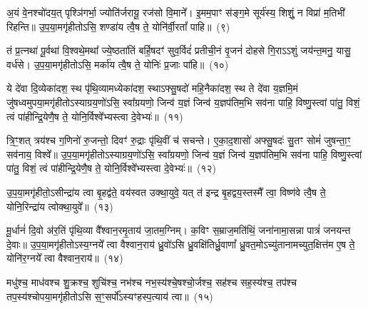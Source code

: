 {\anuvakamend[{प्रा॒त॒र्युजा॒वेका॒न्नविꣳ॑शतिः}]}%

अ॒यं वे॒नश्चो॑दय॒त् पृश्ञि॑गर्भा॒ ज्योति॑र्जरायू॒ रज॑सो वि॒माने᳚। इ॒मम॒पाꣳ स॑ङ्ग॒मे सूर्य॑स्य॒ शिशुं॒ न विप्रा॑ म॒तिभी॑ रिहन्ति॥ उ॒प॒या॒मगृ॑हीतो\-ऽसि॒ शण्डा॑य त्वै॒ष ते॒ योनि॑र्वी॒रतां᳚ पाहि॥~(९)

{\anuvakamend[{अ॒यं वे॒नः पञ्च॑विꣳशतिः}]}%

तं प्र॒त्नथा॑ पू॒र्वथा॑ वि॒श्वथे॒मथा᳚ ज्ये॒ष्ठता॑तिं बर्\mbox{}हि॒षदꣳ॑ सुव॒र्विदं॑ प्रतीची॒नं वृ॒जनं॑ दोहसे गि॒रा\-ऽऽ\-शुं जय॑न्त॒मनु॒ यासु॒ वर्ध॑से। उ॒प॒या॒मगृ॑हीतो\-ऽसि॒ मर्का॑य त्वै॒ष ते॒ योनिः॑ प्र॒जाः पा॑हि॥~(१०)

{\anuvakamend[{तꣳ षड्विꣳ॑शतिः}]}%

ये दे॑वा दि॒व्येका॑\-दश॒ स्थ पृ॑थि॒व्यामध्येका॑\-दश॒ स्था\-ऽफ्सु॒षदो॑ महि॒नैका॑\-दश॒ स्थ ते दे॑वा य॒ज्ञमि॒मं जु॑षध्वमुपया॒मगृ॑हीतो\-ऽस्याग्रय॒णो॑\-ऽसि॒ स्वा᳚ग्रयणो॒ जिन्व॑ य॒ज्ञं जिन्व॑ य॒ज्ञप॑तिम॒भि सव॑ना पाहि॒ विष्णु॒स्त्वां पा॑तु॒ विशं॒ त्वं पा॑हीन्द्रि॒येणै॒ष ते॒ योनि॒र्विश्वे᳚भ्यस्त्वा दे॒वेभ्यः॑॥~(११)

{\anuvakamend[{ये दे॑वा॒स्त्रिच॑त्वारिꣳशत्}]}%

त्रि॒ꣳ॒शत् त्रय॑श्च ग॒णिनो॑ रु॒जन्तो॒ दिवꣳ॑ रु॒द्राः पृ॑थि॒वीं च॑ सचन्ते। ए॒का॒द॒शासो॑ अफ्सु॒षदः॑ सु॒तꣳ सोमं॑ जुषन्ता॒ꣳ॒ सव॑नाय॒ विश्वे᳚॥ उ॒प॒या॒मगृ॑हीतो\-ऽस्याग्रय॒णो॑\-ऽसि॒ स्वा᳚ग्रयणो॒ जिन्व॑ य॒ज्ञं जिन्व॑ य॒ज्ञप॑तिम॒भि सव॑ना पाहि॒ विष्णु॒स्त्वां पा॑तु॒ विशं॒ त्वं पा॑हीन्द्रि॒येणै॒ष ते॒ योनि॒र्विश्वे᳚भ्यस्त्वा दे॒वेभ्यः॑॥~(१२)

{\anuvakamend[{त्रि॒ꣳ॒शद् द्विच॑त्वारिꣳशत्}]}%

उ॒प॒या॒मगृ॑हीतो॒\-ऽसीन्द्रा॑य त्वा बृ॒हद्व॑ते॒ वय॑स्वत उक्था॒युवे॒ यत् त॑ इन्द्र बृ॒हद्वय॒स्तस्मै᳚ त्वा॒ विष्ण॑वे त्वै॒ष ते॒ योनि॒रिन्द्रा॑य त्वोक्था॒युवे᳚॥~(१३)

{\anuvakamend[{उ॒प॒या॒मगृ॑हीतो॒ द्वाविꣳ॑शतिः}]}%

मू॒र्धानं॑ दि॒वो अ॑र॒तिं पृ॑थि॒व्या वै᳚श्वान॒रमृ॒ताय॑ जा॒तम॒ग्निम्। क॒विꣳ स॒म्राज॒मति॑थिं॒ जना॑नामा॒सन्ना पात्रं॑ जनयन्त दे॒वाः॥ उ॒प॒या॒मगृ॑हीतो\-ऽस्य॒ग्नये᳚ त्वा वैश्वान॒राय॑ ध्रु॒वो॑\-ऽसि ध्रु॒वक्षि॑तिर्ध्रु॒वाणां᳚ ध्रु॒वत॒मो\-ऽच्यु॑तानामच्युत॒क्षित्त॑म ए॒ष ते॒ योनि॑र॒ग्नये᳚ त्वा वैश्वान॒राय॑॥~(१४)

{\anuvakamend[{मू॒र्धानं॒ पञ्च॑त्रिꣳशत्}]}%

मधु॑श्च॒ माध॑वश्च शु॒क्रश्च॒ शुचि॑श्च॒ नभ॑श्च नभ॒स्य॑श्चे॒षश्चो॒र्जश्च॒ सह॑श्च सह॒स्य॑श्च॒ तप॑श्च तप॒स्य॑श्चोपया॒मगृ॑हीतो\-ऽसि स॒ꣳ॒सर्पो᳚\-ऽस्यꣳहस्प॒त्याय॑ त्वा॥~(१५)

